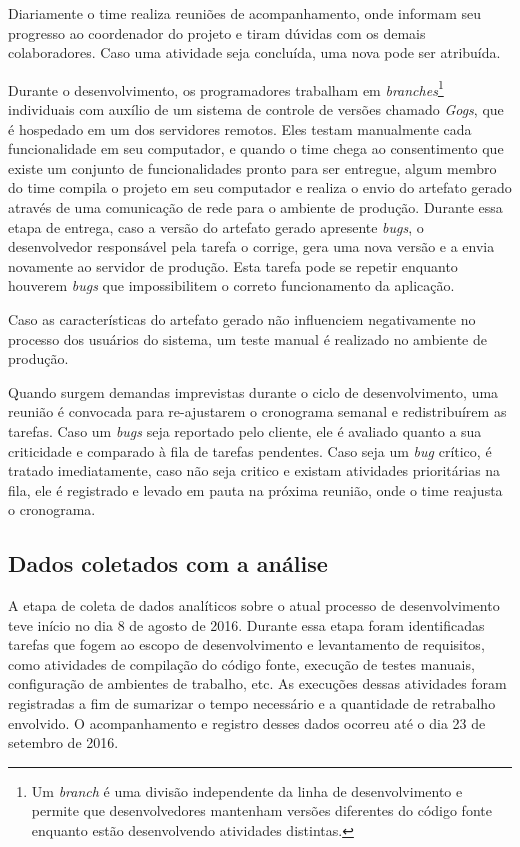 \documentclass[
	12pt,				%
	openright,			%
	oneside,			%
	a4paper,			%
	english,			%
	french,				%
	spanish,			%
	brazil,				%
	]{abntex2}
\begin{document}
Diariamente o time realiza reuniões de acompanhamento, onde informam seu progresso ao coordenador do projeto e tiram dúvidas com os demais colaboradores. Caso uma atividade seja concluída, uma nova pode ser atribuída.

Durante o desenvolvimento, os programadores trabalham em \textit{branches}\footnote{Um \textit{branch} é uma divisão independente da linha de desenvolvimento e permite que desenvolvedores mantenham versões diferentes do código fonte enquanto estão desenvolvendo atividades distintas.} individuais com auxílio de um sistema de controle de versões chamado \textit{Gogs}, que é hospedado em um dos servidores remotos. Eles testam manualmente cada funcionalidade em seu computador, e quando o time chega ao consentimento que existe um conjunto de funcionalidades pronto para ser entregue, algum membro do time compila o projeto em seu computador e realiza o envio do artefato gerado através de uma comunicação de rede para o ambiente de produção. Durante essa etapa de entrega, caso a versão do artefato gerado apresente \textit{bugs}, o desenvolvedor responsável pela tarefa o corrige, gera uma nova versão e a envia novamente ao servidor de produção. Esta tarefa pode se repetir enquanto houverem \textit{bugs} que impossibilitem o correto funcionamento da aplicação.

Caso as características do artefato gerado não influenciem negativamente no processo dos usuários do sistema, um teste manual é realizado no ambiente de produção.

Quando surgem demandas imprevistas durante o ciclo de desenvolvimento, uma reunião é convocada para re-ajustarem o cronograma semanal e redistribuírem as tarefas. Caso um \textit{bugs} seja reportado pelo cliente, ele é avaliado quanto a sua criticidade e comparado à fila de tarefas pendentes. Caso seja um \textit{bug} crítico, é tratado imediatamente, caso não seja critico e existam atividades prioritárias na fila, ele é registrado e levado em pauta na próxima reunião, onde o time reajusta o cronograma.

\subsection{Dados coletados com a análise}

A etapa de coleta de dados analíticos sobre o atual processo de desenvolvimento teve início no dia 8 de agosto de 2016. Durante essa etapa foram identificadas tarefas que fogem ao escopo de desenvolvimento e levantamento de requisitos, como atividades de compilação do código fonte, execução de testes manuais, configuração de ambientes de trabalho, etc. As execuções dessas atividades foram registradas a fim de sumarizar o tempo necessário e a quantidade de retrabalho envolvido. O acompanhamento e registro desses dados ocorreu até o dia 23 de setembro de 2016.
\end{document}
